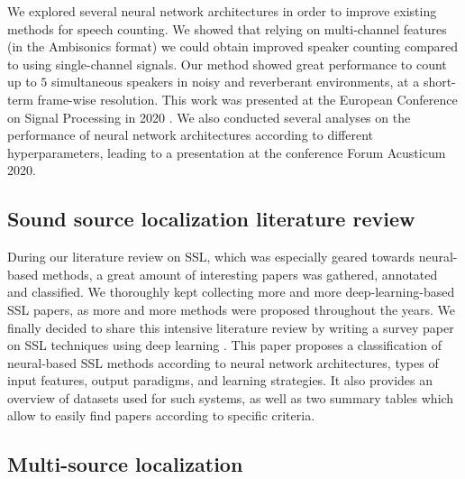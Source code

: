 We explored several neural network architectures in order to improve existing methods for speech counting. We showed that relying on multi-channel features (in the Ambisonics format) we could obtain improved speaker counting compared to using single-channel signals. Our method showed great performance to count up to $5$ simultaneous speakers in noisy and reverberant environments, at a short-term frame-wise resolution. This work was presented at the European Conference on Signal Processing in 2020 \cite{grumiaux_high-resolution_2020}. We also conducted several analyses on the performance of neural network architectures according to different hyperparameters, leading to a presentation \cite{grumiaux_multichannel_2020} at the conference Forum Acusticum 2020.

\subsection{Sound source localization literature review}

During our literature review on SSL, which was especially geared towards neural-based methods, a great amount of interesting papers was gathered, annotated and classified. We thoroughly kept collecting more and more deep-learning-based SSL papers, as more and more methods were proposed throughout the years. We finally decided to share this intensive literature review by writing a survey paper on SSL techniques using deep learning \cite{grumiaux_survey_2021}. This paper proposes a classification of neural-based SSL methods according to neural network architectures, types of input features, output paradigms, and learning strategies. It also provides an overview of datasets used for such systems, as well as two summary tables which allow to easily find papers according to specific criteria.

\subsection{Multi-source localization}


